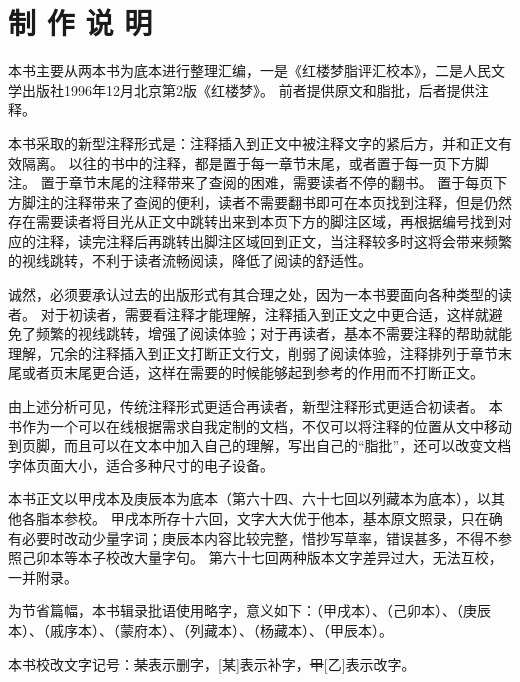\chapter{制 作 说 明}

本书主要从两本书为底本进行整理汇编，一是《红楼梦脂评汇校本》，二是人民文学出版社1996年12月北京第2版《红楼梦》。
前者提供原文和脂批，后者提供注释。
\par
本书采取的新型注释形式是：注释插入到正文中被注释文字的紧后方，并和正文有效隔离。
以往的书中的注释，都是置于每一章节末尾，或者置于每一页下方脚注。
置于章节末尾的注释带来了查阅的困难，需要读者不停的翻书。
置于每页下方脚注的注释带来了查阅的便利，读者不需要翻书即可在本页找到注释，但是仍然存在需要读者将目光从正文中跳转出来到本页下方的脚注区域，再根据编号找到对应的注释，读完注释后再跳转出脚注区域回到正文，当注释较多时这将会带来频繁的视线跳转，不利于读者流畅阅读，降低了阅读的舒适性。
\par
诚然，必须要承认过去的出版形式有其合理之处，因为一本书要面向各种类型的读者。
对于初读者，需要看注释才能理解，注释插入到正文之中更合适，这样就避免了频繁的视线跳转，增强了阅读体验；对于再读者，基本不需要注释的帮助就能理解，冗余的注释插入到正文打断正文行文，削弱了阅读体验，注释排列于章节末尾或者页末尾更合适，这样在需要的时候能够起到参考的作用而不打断正文。
\par
由上述分析可见，传统注释形式更适合再读者，新型注释形式更适合初读者。
本书作为一个可以在线根据需求自我定制的文档，不仅可以将注释的位置从文中移动到页脚，而且可以在文本中加入自己的理解，写出自己的“脂批”，还可以改变文档字体页面大小，适合多种尺寸的电子设备。
\par
本书正文以甲戌本及庚辰本为底本（第六十四、六十七回以列藏本为底本），以其他各脂本参校。
甲戌本所存十六回，文字大大优于他本，基本原文照录，只在确有必要时改动少量字词；庚辰本内容比较完整，惜抄写草率，错误甚多，不得不参照己卯本等本子校改大量字句。
第六十七回两种版本文字差异过大，无法互校，一并附录。
\par
为节省篇幅，本书辑录批语使用略字，意义如下：\jia{}（甲戌本）、\ji{}（己卯本）、\geng{}（庚辰本）、\qi{}（戚序本）、\meng{}（蒙府本）、\lie{}（列藏本）、\yang{}（杨藏本）、\chen{}（甲辰本）。
\par
本书校改文字记号：\sout{某}表示删字，[某]表示补字，\sout{甲}[乙]表示改字。
